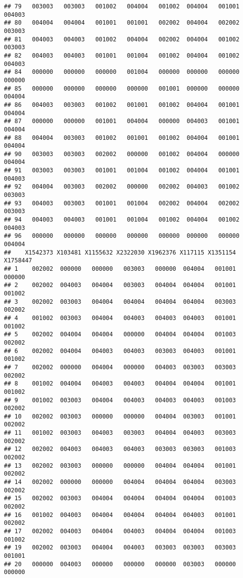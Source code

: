\documentclass[
]{article}
\begin{document}
\begin{verbatim}
## 79   003003   003003   001002   004004   001002  004004   001001  004003
## 80   004004   004004   001001   001001   002002  004004   002002  003003
## 81   004003   004003   001002   004004   002002  004004   001002  003003
## 82   004003   004003   001001   001004   001002  004004   001002  004003
## 84   000000   000000   000000   001004   000000  000000   000000  000000
## 85   000000   000000   000000   000000   001001  000000   000000  004004
## 86   004003   003003   001002   001001   001002  004004   001001  004004
## 87   000000   000000   001001   004004   000000  004003   001001  004004
## 88   004004   003003   001002   001001   001002  004004   001001  004004
## 90   003003   003003   002002   000000   001002  004004   000000  004004
## 91   003003   003003   001001   001004   001002  004004   001001  004003
## 92   004004   003003   002002   000000   002002  004003   001002  003003
## 93   004003   003003   001001   001004   002002  004004   002002  003003
## 94   004003   004003   001001   001004   001002  004004   001002  004003
## 96   000000   000000   000000   000000   000000  000000   000000  004004
##    X1542373 X103481 X1155632 X2322030 X1962376 X117115 X1351154 X1758447
## 1    002002  000000   000000   003003   000000  004004   001001   000000
## 2    002002  004003   004004   003003   004004  004004   001001   001002
## 3    002002  003003   004004   004004   004004  004004   003003   002002
## 4    001002  003003   004004   004003   004003  004003   001001   001002
## 5    002002  004004   004004   000000   004004  004004   001003   002002
## 6    002002  004004   004003   004003   003003  004003   001001   001002
## 7    002002  000000   004004   000000   004003  003003   003003   002002
## 8    001002  004004   004003   004003   004004  004004   001001   001002
## 9    001002  003003   004004   004003   004003  004003   001003   002002
## 10   002002  003003   000000   000000   004004  003003   001001   002002
## 11   001002  003003   004003   003003   004004  004003   003003   002002
## 12   002002  004003   004003   004003   003003  003003   001003   002002
## 13   002002  003003   000000   000000   004004  004004   001001   002002
## 14   002002  000000   000000   004004   004004  004004   003003   002002
## 15   002002  003003   004004   004004   004004  004004   001003   002002
## 16   001002  004003   004004   004004   004004  004003   001001   002002
## 17   002002  004003   004004   004003   004004  004004   001003   001002
## 19   002002  003003   004004   004003   003003  003003   003003   001001
## 20   000000  004003   000000   000000   000000  003003   000000   000000

\end{verbatim}
\end{document}
